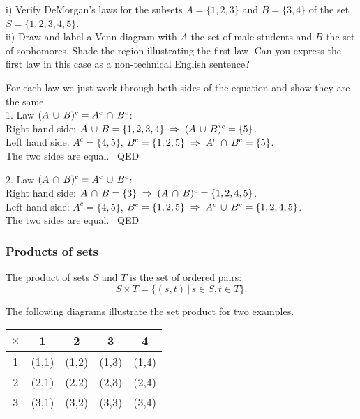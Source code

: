 \numexamp  
i) Verify DeMorgan's laws for the subsets $A = \{1,2,3\}$ and $B = \{3,4\}$ of the set $S = \{1,2,3,4,5\}$.  \\
ii) Draw and label a Venn diagram with $A$ the set of male students and $B$ the set of sophomores.  Shade the region illustrating the first law.  Can you express the first law in this case as a non-technical English sentence?

\ans For each law we just work through both sides of the equation and 
show they are the same.\\
1. Law $(A\,\cup\, B)^c = A^c\,\cap\, B^c$:\\
Right hand side: $A\,\cup\, B = \{1,2,3,4\} \; \Rightarrow \; (A\,\cup\, B)^c = \{5\}$.\\
Left hand side: $A^c = \{4,5\}$, $B^c = \{1,2,5\}
\; \Rightarrow \; A^c\,\cap\, B^c = \{5\}$. \\
The two sides are equal. \, QED

2. Law $(A\,\cap\, B)^c = A^c\,\cup\, B^c$:\\
Right hand side: $A\,\cap\, B = \{3\} \; \Rightarrow \; (A\,\cap\, B)^c = \{1,2,4,5\}$.\\
Left hand side: $A^c = \{4,5\}$, $B^c = \{1,2,5\}
\; \Rightarrow \; A^c\,\cup\, B^c = \{1,2,4,5\}$.\\ 
The two sides are equal. \, QED


\subsubsection{Products of sets}
The product of sets $S$ and $T$ is the set of ordered pairs:
$$S \times T = \{(s,t) \,| \, s\in S, t \in T\}.$$

The following diagrams illustrate the set product for two examples.\\
\parbox[l]{2.8in}{
\begin{tabular}{c|c|c|c|c|}
$\times$ & 1 & 2 & 3 & 4\\
\hline
1 & (1,1) & (1,2) & (1,3) & (1,4)\\
\hline
2 & (2,1) & (2,2) & (2,3) & (2,4)\\
\hline
3 & (3,1) & (3,2) & (3,3) & (3,4)\\
\hline
\end{tabular}\\[1.5ex]
\\[3ex] %
}
\parbox[1]{2.8in}{
\def\sc{.8cm}
\def\fillc{red!60!blue}
\mcent{$[1,4] \times [1,3] \subset [0,5] \times [0,4]$}
}

